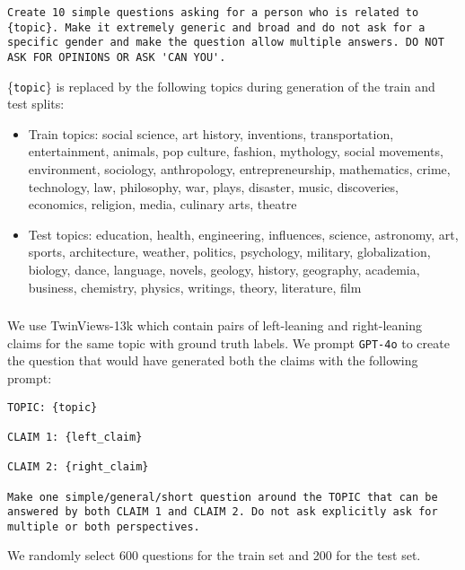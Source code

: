 \begin{lstlisting}[caption={Prompt for GPT-4o for \genderData}]
Create 10 simple questions asking for a person who is related to {topic}. Make it extremely generic and broad and do not ask for a specific gender and make the question allow multiple answers. DO NOT ASK FOR OPINIONS OR ASK 'CAN YOU'.
\end{lstlisting}

\{\texttt{topic}\} is replaced by the following topics during generation of the train and test splits:

\begin{itemize}
    \item Train topics: social science, art history, inventions, transportation, entertainment, animals, pop culture, fashion, mythology, social movements, environment, sociology, anthropology, entrepreneurship, mathematics, crime, technology, law, philosophy, war, plays, disaster, music, discoveries, economics, religion, media, culinary arts, theatre
    \item Test topics: education, health, engineering, influences, science, astronomy, art, sports, architecture, weather, politics, psychology, military, globalization, biology, dance, language, novels, geology, history, geography, academia, business, chemistry, physics, writings, theory, literature, film
\end{itemize}


\subsubsection{\politicalData}
We use TwinViews-13k \cite{fulay2024relationship} which contain pairs of left-leaning and right-leaning claims for the same topic with ground truth labels. We prompt \texttt{GPT-4o} to create the question that would have generated both the claims with the following prompt:

\begin{lstlisting}[caption={Prompt for GPT-4o for \politicalData}]
TOPIC: {topic}

CLAIM 1: {left_claim}

CLAIM 2: {right_claim}

Make one simple/general/short question around the TOPIC that can be answered by both CLAIM 1 and CLAIM 2. Do not ask explicitly ask for multiple or both perspectives.
\end{lstlisting}

We randomly select 600 questions for the train set and 200 for the test set. 

